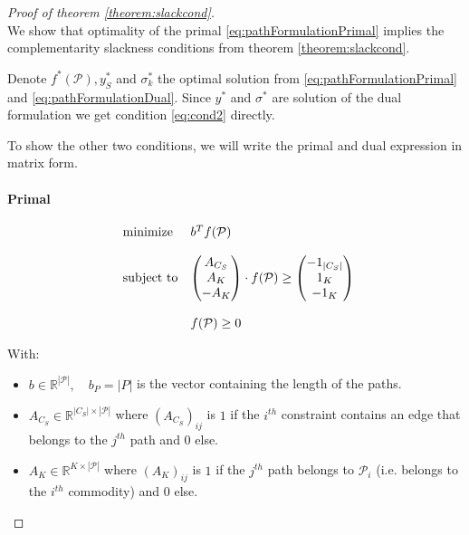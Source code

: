 \documentclass[14pt,a4paper]{article}
\theoremstyle{definition}
\numberwithin{equation}{subsection}
\begin{document}
\begin{proof}[Proof of theorem \ref{theorem:slackcond}]$ $\\
	 We show that optimality of the primal \eqref{eq:pathFormulationPrimal} implies the complementarity slackness conditions from theorem \ref{theorem:slackcond}. 
	 
	 Denote $f^*(\mathcal{P}),y^*_{S}$ and $\sigma^*_k$ the optimal solution from \eqref{eq:pathFormulationPrimal} and \eqref{eq:pathFormulationDual}. Since $y^*$ and $\sigma^*$ are solution of the dual formulation we get condition \eqref{eq:cond2} directly.
	 
	 To show the other two conditions, we will write the primal and dual expression in matrix form.
	 
	 \paragraph{Primal}
	 \begin{equation}
	 	\begin{array}{ll@{}ll}
	 \text{minimize}  &b^T f(\mathcal{P})  \\
	 \\
	 \text{subject to} 
	 &\left( \begin{matrix} A_{C_S}	\\ A_K \\ -A_K \\ \end{matrix} \right) \cdot f(\mathcal{P}) \geq  \left( \begin{matrix} -1_{|C_S|}	\\ 1_K \\ -1_K \\ \end{matrix} \right) \\
	 \\
	                                          &f(\mathcal{P}) \geq 0
	 \end{array}
	 \label{eq:matrixformprimal}
	 \end{equation}
	 
	 With: 
	 \begin{itemize}
	 	\item $b \in \mathbb{R}^{|\mathcal{P}|}, \quad b_P = |P|$ is the vector containing the length of the paths.
	 	\item $A_{C_S} \in \mathbb{R}^{|C_S|\times |\mathcal{P}|}$ where $\left(A_{C_S}\right)_{ij}$ is $1$ if the $i^{th}$ constraint contains an edge that belongs to the $j^{th}$ path and $0$ else.
	 	\item $A_K \in \mathbb{R}^{K\times |\mathcal{P}|}$ where $\left(A_K\right)_{ij}$ is $1$ if the $j^{th}$ path belongs to $\mathcal{P}_i$ (i.e. belongs to the $i^{th}$ commodity) and $0$ else.
	 \end{itemize}
 

\end{proof}
\end{document}
